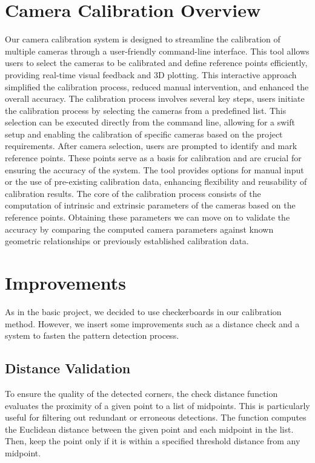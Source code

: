 \documentclass{template}
\begin{document}
\section{Camera Calibration Overview}
Our camera calibration system is designed to streamline the calibration of multiple cameras through a user-friendly command-line interface. This tool allows users to select the cameras to be calibrated and define reference points efficiently, providing real-time visual feedback and 3D plotting. This interactive approach simplified the calibration process, reduced manual intervention, and enhanced the overall accuracy. 
The calibration process involves several key steps, users initiate the calibration process by selecting the cameras from a predefined list. This selection can be executed directly from the command line, allowing for a swift setup and enabling the calibration of specific cameras based on the project requirements. After camera selection, users are prompted to identify and mark reference points. These points serve as a basis for calibration and are crucial for ensuring the accuracy of the system. The tool provides options for manual input or the use of pre-existing calibration data, enhancing flexibility and reusability of calibration results.
The core of the calibration process consists of the computation of intrinsic and extrinsic parameters of the cameras based on the reference points. Obtaining these parameters we can move on to validate the accuracy by comparing the computed camera parameters against known geometric relationships or previously established calibration data. 

\section{Improvements}

As in the basic project, we decided to use checkerboards in our calibration method. However, we insert some improvements such as a distance check and a system to fasten the pattern detection process.

\subsection{Distance Validation}
To ensure the quality of the detected corners, the check distance function evaluates the proximity of a given point to a list of midpoints. This is particularly useful for filtering out redundant or erroneous detections. 
The function computes the Euclidean distance between the given point and each midpoint in the list. Then, keep the point only if it is within a specified threshold distance from any midpoint.
\end{document}
